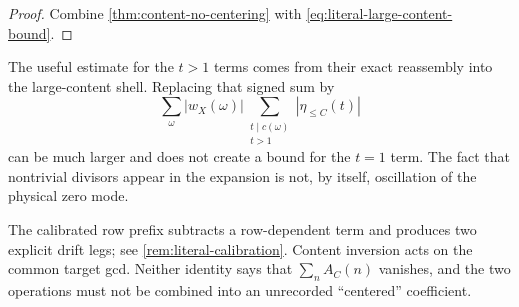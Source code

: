 \begin{proof}
Combine \cref{thm:content-no-centering} with
\eqref{eq:literal-large-content-bound}.
\end{proof}

\begin{remark}
The useful estimate for the \(t>1\) terms comes from their exact
reassembly into the large-content shell.  Replacing that signed sum by
\[
 \sum_{\omega}|w_X(\omega)|
 \sum_{\substack{t\mid c(\omega)\\t>1}}
 |\eta_{\le C}(t)|
\]
can be much larger and does not create a bound for the \(t=1\) term.
The fact that nontrivial divisors appear in the expansion is not, by
itself, oscillation of the physical zero mode.
\end{remark}

\begin{remark}
The calibrated row prefix subtracts a row-dependent term and produces
two explicit drift legs; see \cref{rem:literal-calibration}.  Content
inversion acts on the common target gcd.  Neither identity says that
\(\sum_nA_C(n)\) vanishes, and the two operations must not be combined
into an unrecorded ``centered'' coefficient.
\end{remark}
